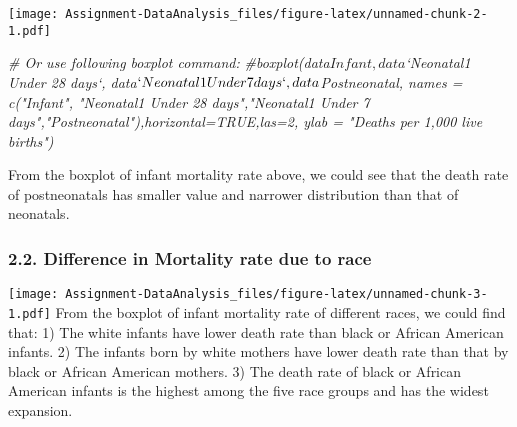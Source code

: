 \documentclass[]{article}
\newenvironment{Shaded}{\begin{snugshade}}{\end{snugshade}}
\newcommand{\CommentTok}[1]{\textcolor[rgb]{0.56,0.35,0.01}{\textit{#1}}}
\newcommand{\DataTypeTok}[1]{\textcolor[rgb]{0.13,0.29,0.53}{#1}}
\newcommand{\KeywordTok}[1]{\textcolor[rgb]{0.13,0.29,0.53}{\textbf{#1}}}
\newcommand{\NormalTok}[1]{#1}
\newcommand{\OperatorTok}[1]{\textcolor[rgb]{0.81,0.36,0.00}{\textbf{#1}}}
\newcommand{\StringTok}[1]{\textcolor[rgb]{0.31,0.60,0.02}{#1}}
\begin{document}
\texttt{[image: Assignment-DataAnalysis\_files/figure-latex/unnamed-chunk-2-1.pdf]}

\begin{Shaded}
\begin{Highlighting}[]
\CommentTok{# Or use following boxplot command:}
\CommentTok{#boxplot(data$Infant, data$`Neonatal1 Under 28 days`, data$`Neonatal1 Under 7 days`, data$Postneonatal, names = c("Infant", "Neonatal1 Under 28 days","Neonatal1 Under 7 days","Postneonatal"),horizontal=TRUE,las=2, ylab = "Deaths per 1,000 live births")}
\end{Highlighting}
\end{Shaded}

From the boxplot of infant mortality rate above, we could see that the
death rate of postneonatals has smaller value and narrower distribution
than that of neonatals.

\hypertarget{difference-in-mortality-rate-due-to-race}{%
\subsubsection{2.2. Difference in Mortality rate due to
race}\label{difference-in-mortality-rate-due-to-race}}

\begin{Shaded}
\end{Shaded}

\texttt{[image: Assignment-DataAnalysis\_files/figure-latex/unnamed-chunk-3-1.pdf]}
From the boxplot of infant mortality rate of different races, we could
find that: 1) The white infants have lower death rate than black or
African American infants. 2) The infants born by white mothers have
lower death rate than that by black or African American mothers. 3) The
death rate of black or African American infants is the highest among the
five race groups and has the widest expansion.
\end{document}
